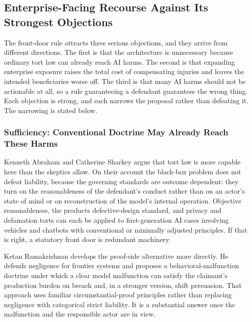 
\subsection{Enterprise-Facing Recourse Against Its Strongest Objections}

The front-door rule attracts three serious objections, and they arrive from
different directions. The first is that the architecture is unnecessary
because ordinary tort law can already reach AI harms. The second is that
expanding enterprise exposure raises the total cost of compensating injuries
and leaves the intended beneficiaries worse off. The third is that many AI
harms should not be actionable at all, so a rule guaranteeing a defendant
guarantees the wrong thing. Each objection is strong, and each narrows the
proposal rather than defeating it. The narrowing is stated below.

\subsubsection{Sufficiency: Conventional Doctrine May Already Reach These Harms}

Kenneth Abraham and Catherine Sharkey argue that tort law is more capable here
than the skeptics allow. On their account the black-box problem does not defeat
liability, because the governing standards are outcome dependent: they turn on
the reasonableness of the defendant's conduct rather than on an actor's state
of mind or on reconstruction of the model's internal operation. Objective
reasonableness, the products defective-design standard, and privacy and
defamation torts can each be applied to first-generation AI cases involving
vehicles and chatbots with conventional or minimally adjusted principles. If that is right, a statutory front door is
redundant machinery.

Ketan Ramakrishnan develops the proof-side alternative more directly. He
defends negligence for frontier systems and proposes a behavioral-malfunction
doctrine under which a clear model malfunction can satisfy the claimant's
production burden on breach and, in a stronger version, shift persuasion. That
approach uses familiar circumstantial-proof principles rather than replacing
negligence with categorical strict liability. It is a
substantial answer once the malfunction and the responsible actor are in view.

